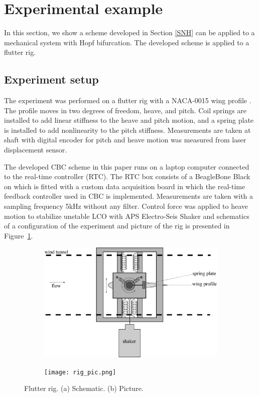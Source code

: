 \documentclass[openacc]{rsproca_new}%
\theoremstyle{own}
\newcommand{\Fref}[1]{Figure~\ref{#1}}
\begin{document}
\section{Experimental example}
In this section, we show a scheme developed in Section \ref{SNH} can be applied to a mechanical system with Hopf bifurcation. The developed scheme is applied to a flutter rig.

\subsection{Experiment setup}
The experiment was performed on a flutter rig with a NACA-0015 wing profile \cite{jacobs1933characteristics}. The profile moves in two degrees of freedom, heave, and pitch. Coil springs are installed to add linear stiffness to the heave and pitch motion, and a spring plate is installed to add nonlinearity to the pitch stiffness. Measurements are taken at shaft with digital encoder for pitch and heave motion was measured from laser displacement sensor.

The developed CBC scheme in this paper runs on a laptop computer connected to the real-time controller (RTC). The RTC box consists of a BeagleBone Black on which is fitted with a custom data acquisition board \cite{rtc2} in which the real-time feedback controller used in CBC is implemented. Measurements are taken with a sampling frequency  5kHz without any filter.  Control force was applied to heave motion to stabilize unstable LCO with APS Electro-Seis Shaker and schematics of a configuration of the experiment and picture of the rig is presented in \Fref{f:rig}.

\begin{figure}
  \centering
  \begin{subfigure}[b]{0.5\linewidth}
    \includegraphics[width=\linewidth]{flutter_rig.eps}
    \caption{}
  \end{subfigure}
  \begin{subfigure}[b]{0.45\linewidth}
    \texttt{[image: rig\_pic.png]}
    \caption{}
  \end{subfigure}
  \caption{Flutter rig. (a) Schematic. (b) Picture.}
  \label{f:rig}
\end{figure}
\end{document}
